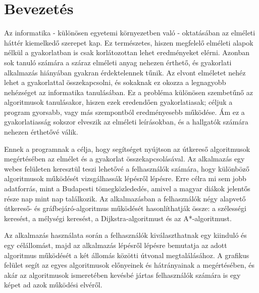 \chapter{Bevezetés}
\label{ch:intro}

Az informatika - különösen egyetemi környezetben való - oktatásában az elméleti háttér kiemelkedő szerepet kap. Ez természetes, hiszen megfelelő elméleti alapok nélkül a gyakorlatban is csak korlátozottan lehet eredményeket elérni. Azonban sok tanuló számára a száraz elméleti anyag nehezen érthető, és gyakorlati alkalmazás hiányában gyakran érdektelennek tűnik. Az elvont elméletet nehéz lehet a gyakorlattal összekapcsolni, és sokaknak ez okozza a legnagyobb nehézséget az informatika tanulásában. Ez a probléma különösen szembetűnő az algoritmusok tanulásakor, hiszen ezek eredendően gyakorlatiasak; céljuk a program gyorsabb, vagy más szempontból eredményesebb működése. Ám ez a gyakorlatiasság sokszor elveszik az elméleti leírásokban, és a hallgatók számára nehezen érthetővé válik.

Ennek a programnak a célja, hogy segítséget nyújtson az útkereső algoritmusok megértésében az elmélet és a gyakorlat összekapcsolásával. Az alkalmazás egy webes felületen keresztül teszi lehetővé a felhasználók számára, hogy különböző algoritmusok működését vizsgálhassák lépésről lépésre. Erre célra mi sem jobb adatforrás, mint a Budapesti tömegközlededés, amivel a magyar diákok jelentős része nap mint nap találkozik. Az alkalmazásban a felhasználók négy alapvető útkereső- és gráfbejáró-algoritmus működését hasonlíthatják össze: a szélességi keresést, a mélységi keresést, a Dijkstra-algoritmust és az A*-algoritmust.

\pagebreak
Az alkalmazás használata során a felhasználók kiválaszthatnak egy kiinduló és egy célállomást, majd az alkalmazás lépésről lépésre bemutatja az adott algoritmus működését a két állomás közötti útvonal megtalálásához. A grafikus felület segít az egyes algoritmusok előnyeinek és hátrányainak a megértésében, és akár az algoritmusok ismeretében kevésbé jártas felhasználók számára is egy képet ad azok működési elvéről.
